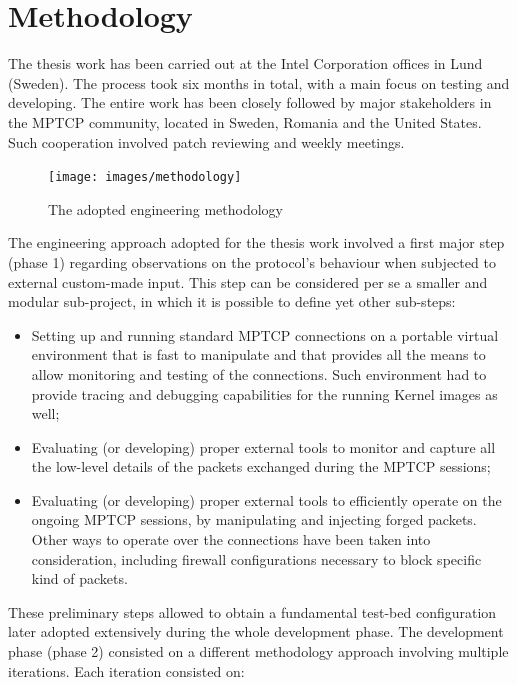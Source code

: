 \section{Methodology}
The thesis work has been carried out at the Intel Corporation offices in Lund (Sweden). The process took six months in total, with a main focus on testing and developing. The entire work has been closely followed by major stakeholders in the MPTCP community, located in Sweden, Romania and the United States. Such cooperation involved patch reviewing and weekly meetings.

\begin{figure}[!htb]
\centering
\texttt{[image: images/methodology]}
\caption{The adopted engineering methodology}
\label{fig:methodology}
\end{figure}

The engineering approach adopted for the thesis work involved a first major step (phase 1) regarding observations on the protocol's behaviour when subjected to external custom-made input. This step can be considered per se a smaller and modular sub-project, in which it is possible to define yet other sub-steps:

\begin{itemize}
    \item Setting up and running standard MPTCP connections on a portable virtual environment that is fast to manipulate and that provides all the means to allow monitoring and testing of the connections. Such environment had to provide tracing and debugging capabilities for the running Kernel images as well;
    \item Evaluating (or developing) proper external tools to monitor and capture all the low-level details of the packets exchanged during the MPTCP sessions;
    \item Evaluating (or developing) proper external tools to efficiently operate on the ongoing MPTCP sessions, by manipulating and injecting forged packets. Other ways to operate over the connections have been taken into consideration, including firewall configurations necessary to block specific kind of packets.
\end{itemize}

These preliminary steps allowed to obtain a fundamental test-bed configuration later adopted extensively during the whole development phase. 
The development phase (phase 2) consisted on a different methodology approach involving multiple iterations. Each iteration consisted on:

